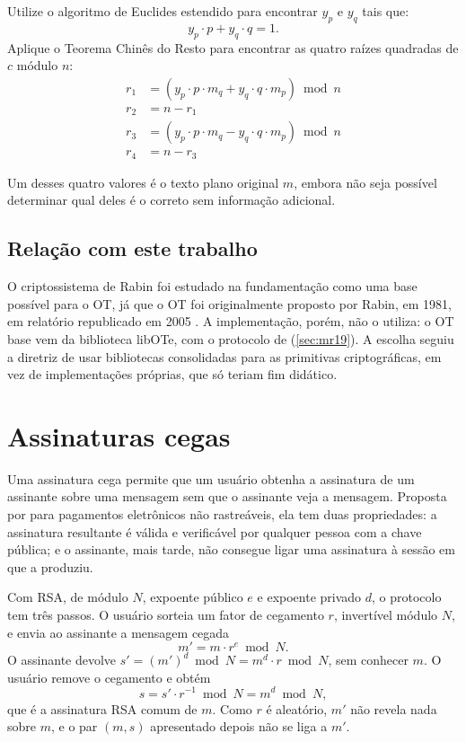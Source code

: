 Utilize o algoritmo de Euclides estendido para encontrar $y_p$ e $y_q$ tais
que:
\[
y_p \cdot p + y_q \cdot q = 1.
\]
Aplique o Teorema Chinês do Resto para encontrar as quatro raízes quadradas de
$c$ módulo $n$:
\begin{align*}
r_1 &= (y_p \cdot p \cdot m_q + y_q \cdot q \cdot m_p) \bmod n \\
r_2 &= n - r_1 \\
r_3 &= (y_p \cdot p \cdot m_q - y_q \cdot q \cdot m_p) \bmod n \\
r_4 &= n - r_3
\end{align*}

Um desses quatro valores é o texto plano original $m$, embora não seja
possível determinar qual deles é o correto sem informação adicional.

\subsection{Relação com este trabalho}

O criptossistema de Rabin foi estudado na fundamentação como uma base possível
para o OT, já que o OT foi originalmente proposto por Rabin, em 1981, em relatório republicado em 2005 \cite{rabin2005}.
A implementação, porém, não o utiliza: o OT base vem da biblioteca libOTe,
com o protocolo de  (\autoref{sec:mr19}). A
escolha seguiu a diretriz de usar bibliotecas consolidadas para as
primitivas criptográficas, em vez de implementações próprias, que só teriam
fim didático.

\section{Assinaturas cegas}\label{sec:assinatura-cega}

Uma assinatura cega permite que um usuário obtenha a assinatura de um
assinante sobre uma mensagem sem que o assinante veja a mensagem. Proposta por
 para pagamentos eletrônicos não rastreáveis, ela tem
duas propriedades: a assinatura resultante é válida e verificável por
qualquer pessoa com a chave pública; e o assinante, mais tarde, não consegue
ligar uma assinatura à sessão em que a produziu.

Com RSA, de módulo $N$, expoente público $e$ e expoente privado $d$, o
protocolo tem três passos. O usuário sorteia um fator de cegamento $r$,
invertível módulo $N$, e envia ao assinante a mensagem cegada
\[
m' = m \cdot r^e \bmod N.
\]
O assinante devolve $s' = (m')^d \bmod N = m^d \cdot r \bmod N$, sem conhecer
$m$. O usuário remove o cegamento e obtém
\[
s = s' \cdot r^{-1} \bmod N = m^d \bmod N,
\]
que é a assinatura RSA comum de $m$. Como $r$ é aleatório, $m'$ não revela nada
sobre $m$, e o par $(m, s)$ apresentado depois não se liga a $m'$.

